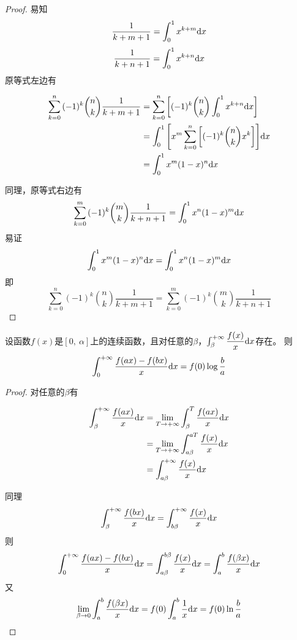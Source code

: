 \begin{proof}

    易知
    $$\dfrac{1}{k + m + 1} = \int_{0}^{1}{x^{k + m}}\mathrm{d} x$$
    $$\dfrac{1}{k + n + 1} = \int_{0}^{1}{x^{k + n}}\mathrm{d} x$$
    原等式左边有
    
    \begin{align*}
        \sum\limits_{k = 0}^{n}{(-1)^k \binom{n}{k}\dfrac{1}{k + m + 1}} & =  \sum\limits_{k = 0}^{n}{\left[(-1)^k \binom{n}{k} \int_{0}^{1}{x^{k + n}}\mathrm{d} x\right]} \\
        & = \int_{0}^{1}{\left[x^m \sum\limits_{k = 0}^{n}{\left[(-1)^k\binom{n}{k} x^k\right]}\right]}\mathrm{d} x \\
        & = \int_{0}^{1}{x^m (1 - x)^n}\mathrm{d} x        
    \end{align*}

    同理，原等式右边有
    $$\sum\limits_{k = 0}^{m}{(-1)^k \binom{m}{k}\dfrac{1}{k + n + 1}} = \int_{0}^{1}{x^n (1 - x)^m}\mathrm{d} x$$
    易证
    $$\int_{0}^{1}{x^m (1 - x)^n}\mathrm{d} x = \int_{0}^{1}{x^n (1 - x)^m}\mathrm{d} x$$
    即
    $$\sum\limits_{k = 0}^{n}{(-1)^k \binom{n}{k}\dfrac{1}{k + m + 1}} = \sum\limits_{k = 0}^{m}{(-1)^k \binom{m}{k}\dfrac{1}{k + n + 1}}$$

\end{proof}

\begin{theorem}[Frullani定理]

    设函数$f(x)$是$[0,\ \alpha]$上的连续函数，且对任意的$\beta$，$\int_{\beta}^{+\infty}{\dfrac{f(x)}{x}}\mathrm{d} x$存在。
    则
    $$\int_{0}^{+\infty}{\dfrac{f(ax) - f(bx)}{x}}\mathrm{d} x = f(0)\log{\dfrac{b}{a}}$$

\end{theorem}

\begin{proof}

    对任意的$\beta$有
    
    \begin{align*}
        \int_{\beta}^{+\infty}{\dfrac{f(ax)}{{x}}}\mathrm{d} x & = \lim\limits_{T\to +\infty}{\int_{\beta}^{T}{\dfrac{f(ax)}{{x}}}\mathrm{d} x} \\
        & = \lim\limits_{T\to +\infty}{\int_{a\beta}^{aT}{\dfrac{f(x)}{x}}\mathrm{d} x} \\
        & = \int_{a\beta}^{+\infty}{\dfrac{f(x)}{x}}\mathrm{d} x
    \end{align*}

    同理
    $$\int_{\beta}^{+\infty}{\dfrac{f(bx)}{{x}}}\mathrm{d} x = \int_{b\beta}^{+\infty}{\dfrac{f(x)}{x}}\mathrm{d} x$$
    则
    $$\int_{0}^{+\infty}{\dfrac{f(ax) - f(bx)}{x}}\mathrm{d} x = \int_{a\beta}^{b\beta}{\dfrac{f(x)}{x}}\mathrm{d} x = \int_{a}^{b}{\dfrac{f(\beta x)}{x}}\mathrm{d} x$$
    又
    $$\lim\limits_{\beta \to 0}{\int_{a}^{b}{\dfrac{f(\beta x)}{x}}\mathrm{d} x} = f(0) \int_{a}^{b}{\dfrac{1}{x}}\mathrm{d} x = f(0)\ln{\dfrac{b}{a}}$$
    
\end{proof}

